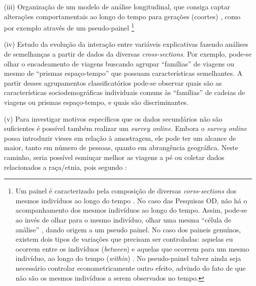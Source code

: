 (iii) Organização de um modelo de análise longitudinal, que consiga captar alterações comportamentais ao longo do tempo para gerações (coortes) \cite{DARGAY2000,STRAMBI2000}, como por exemplo através de um pseudo-painel \cite{DARGAY2002,BRESSON2004,WARUNSIRI2010,NETTO2014a}%
\footnote{Um painel é caracterizado pela composição de diversas \emph{corss-sections} dos mesmos indivíduos ao longo do tempo \cite{DEATON1985,VERBEEK1992,WOOLDRIDGE2002}.
No caso das Pesquisas OD, não há o acompanhamento dos mesmos indivíduos ao longo do tempo. Assim, pode-se ao invés de olhar para o mesmo indivíduo, olhar uma mesma ``célula de análise'' \cite{DEATON1985,NETTO2014}, dando origem a um pseudo painel. 
No caso dos paineis genuínos, existem dois tipos de variações que precisam ser controladas: aquelas eu ocorrem entre os indivíduos (\emph{between}) e aquelas que ocorrem para um mesmo indivíduo, ao longo do tempo (\emph{within}) \cite{FAVERO2013}. No pseudo-painel talvez ainda seja necessário controlar econometricamente outro efeito, advindo do fato de que não são os mesmos indivíduos a serem observados no tempo.}

(iv) Estudo da evolução da interação entre variáveis explicativas fazendo análises de semelhanças a partir de dados da diversas \emph{cross-sections}. Por exemplo, pode-se olhar o encadeamento de viagens \cite{GOULIAS1990} buscando agrupar ``famílias'' de viagens \cite{DALMASO2009} ou mesmo de ``prismas espaço-tempo'' que possuam características semelhantes. A partir desses agrupamentos classificatórios pode-se observar quais são as características sociodemográficas individuais comuns às ``famílias'' de cadeias de viagens ou prismas espaço-tempo, e quais são discriminantes.

(v) Para investigar motivos específicos que os dados secundários não são suficientes é possível também realizar um \emph{survey online}. Embora o \emph{survey online} possa introduzir vieses em relação à amostragem, ele pode ter um alcance de maior, tanto em número de pessoas, quanto em abrangência geográfica. Neste caminho, seria possível esmiuçar melhor as viagens a pé ou coletar dados relacionados a raça/etnia, pois segundo :

